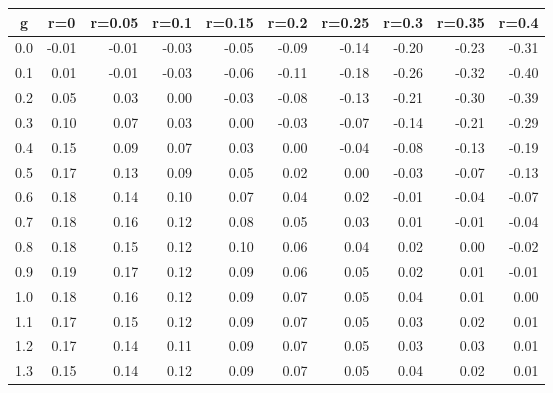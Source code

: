 %
\begin{table}[!tbp]
 \begin{center}
 \begin{tabular}{rrrrrrrrrr}\hline\hline
\multicolumn{1}{c}{g}&\multicolumn{1}{c}{r=0}&\multicolumn{1}{c}{r=0.05}&\multicolumn{1}{c}{r=0.1}&\multicolumn{1}{c}{r=0.15}&\multicolumn{1}{c}{r=0.2}&\multicolumn{1}{c}{r=0.25}&\multicolumn{1}{c}{r=0.3}&\multicolumn{1}{c}{r=0.35}&\multicolumn{1}{c}{r=0.4}\tabularnewline
\hline
0.0&-0.01&-0.01&-0.03&-0.05&-0.09&-0.14&-0.20&-0.23&-0.31\tabularnewline
0.1& 0.01&-0.01&-0.03&-0.06&-0.11&-0.18&-0.26&-0.32&-0.40\tabularnewline
0.2& 0.05& 0.03& 0.00&-0.03&-0.08&-0.13&-0.21&-0.30&-0.39\tabularnewline
0.3& 0.10& 0.07& 0.03& 0.00&-0.03&-0.07&-0.14&-0.21&-0.29\tabularnewline
0.4& 0.15& 0.09& 0.07& 0.03& 0.00&-0.04&-0.08&-0.13&-0.19\tabularnewline
0.5& 0.17& 0.13& 0.09& 0.05& 0.02& 0.00&-0.03&-0.07&-0.13\tabularnewline
0.6& 0.18& 0.14& 0.10& 0.07& 0.04& 0.02&-0.01&-0.04&-0.07\tabularnewline
0.7& 0.18& 0.16& 0.12& 0.08& 0.05& 0.03& 0.01&-0.01&-0.04\tabularnewline
0.8& 0.18& 0.15& 0.12& 0.10& 0.06& 0.04& 0.02& 0.00&-0.02\tabularnewline
0.9& 0.19& 0.17& 0.12& 0.09& 0.06& 0.05& 0.02& 0.01&-0.01\tabularnewline
1.0& 0.18& 0.16& 0.12& 0.09& 0.07& 0.05& 0.04& 0.01& 0.00\tabularnewline
1.1& 0.17& 0.15& 0.12& 0.09& 0.07& 0.05& 0.03& 0.02& 0.01\tabularnewline
1.2& 0.17& 0.14& 0.11& 0.09& 0.07& 0.05& 0.03& 0.03& 0.01\tabularnewline
1.3& 0.15& 0.14& 0.12& 0.09& 0.07& 0.05& 0.04& 0.02& 0.01\tabularnewline
\hline
\end{tabular}

\end{center}

\end{table}

